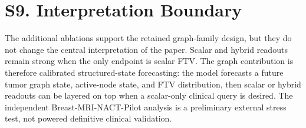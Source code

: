 \documentclass[10pt]{article}
\begin{document}
\section*{S9. Interpretation Boundary}
The additional ablations support the retained graph-family design, but they do
not change the central interpretation of the paper. Scalar and hybrid readouts
remain strong when the only endpoint is scalar FTV. The graph contribution is
therefore calibrated structured-state forecasting: the model forecasts a
future tumor graph state, active-node state, and FTV distribution, then scalar
or hybrid readouts can be layered on top when a scalar-only clinical query is
desired. The independent Breast-MRI-NACT-Pilot analysis is a preliminary
external stress test, not powered definitive clinical validation.
\end{document}
